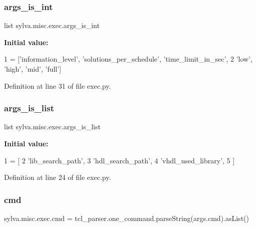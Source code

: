 \subsubsection{\texorpdfstring{args\+\_\+is\+\_\+int}{args\_is\_int}}
{\footnotesize\ttfamily list sylva.\+misc.\+exec.\+args\+\_\+is\+\_\+int}

{\bfseries Initial value\+:}
\begin{DoxyCode}
1 =  [\textcolor{stringliteral}{'information\_level'}, \textcolor{stringliteral}{'solutions\_per\_schedule'}, \textcolor{stringliteral}{'time\_limit\_in\_sec'},
2  \textcolor{stringliteral}{'low'}, \textcolor{stringliteral}{'high'}, \textcolor{stringliteral}{'mid'}, \textcolor{stringliteral}{'full'}]
\end{DoxyCode}


Definition at line 31 of file exec.\+py.

\mbox{\label{namespacesylva_1_1misc_1_1exec_ad4e06816081842df2a374dacb3c53b11}} 
\subsubsection{\texorpdfstring{args\+\_\+is\+\_\+list}{args\_is\_list}}
{\footnotesize\ttfamily list sylva.\+misc.\+exec.\+args\+\_\+is\+\_\+list}

{\bfseries Initial value\+:}
\begin{DoxyCode}
1 =  [
2   \textcolor{stringliteral}{'lib\_search\_path'},
3   \textcolor{stringliteral}{'hdl\_search\_path'},
4   \textcolor{stringliteral}{'vhdl\_used\_library'},
5 ]
\end{DoxyCode}


Definition at line 24 of file exec.\+py.

\mbox{\label{namespacesylva_1_1misc_1_1exec_a49db5f46508c96872b9fd91c17271a25}} 
\subsubsection{\texorpdfstring{cmd}{cmd}}
{\footnotesize\ttfamily sylva.\+misc.\+exec.\+cmd = tcl\+\_\+parser.\+one\+\_\+command.\+parse\+String(args.\+cmd).as\+List()}



